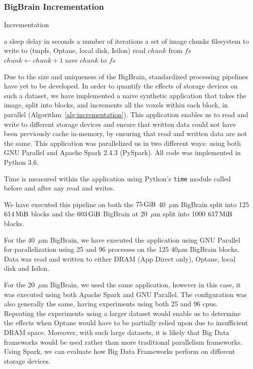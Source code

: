 \documentclass[conference]{IEEEtran}
\newcommand{\Desc}[2]{\State \makebox[2em][l]{#1}#2}
\newcommand{\bigbrain}{BigBrain\xspace}
\begin{document}
\subsubsection{ \bigbrain Incrementation}

\begin{algorithm}\caption{Incrementation}\label{alg:incrementation}
    \begin{algorithmic}[1]
    \Input
        \Desc{$x$}{a sleep delay in seconds}
        \Desc{$n$}{a number of iterations}
        \Desc{$C$}{a set of image chunks}
        \Desc{$fs$}{filesystem to write to (tmpfs, Optane, local disk, Isilon)}
    \EndInput
        \State read $chunk$ from $fs$
        \State $chunk\gets chunk+1$
        \State save $chunk$ to $fs$
    \EndFor
    \end{algorithmic}
\end{algorithm}  

Due to the size and uniqueness of the \bigbrain, standardized processing pipelines
have yet to be developed. In order to quantify the effects of storage devices
on such a dataset, we have implemented a naive synthetic application that takes 
the image, split into blocks, and increments all the voxels within each block, in parallel (Algorithm~\ref{alg:incrementation}).
This application
enables us to read and write to different storage devices and ensure that written
data could not have been previously cache
in-memory, by ensuring that read and written data are not the same. This application
was parallelized us in two different ways: using both GNU Parallel and Apache Spark 2.4.3 (PySpark). 
All code was implemented in Python 3.6.

Time is measured within the application using Python's \texttt{time} module 
called before and after any read and writes.

We have executed this pipeline on both the $\SI{75}{\gibi\byte}$ 40~$\mu$m 
\bigbrain split into 125 $\SI{614}{\mebi\byte}$ blocks and the $\SI{603}{\gibi\byte}$
\bigbrain at 20~$\mu$m split into 1000 $\SI{617}{\mebi\byte}$ blocks.

For the 40~$\mu$m \bigbrain, we have executed the application using GNU Parallel for parallelization
using 25 and 96 processes on the 125 40$\mu$m \bigbrain blocks. Data was read and written to either
DRAM (App Direct only), Optane, local disk and Isilon. 

For the 20~$\mu$m \bigbrain, we used the same application, however in this case, it was executed
using both Apache Spark and GNU Parallel. The configuration was also generally the same, having 
experiments using both 25 and 96 cpus. Repeating the experiments using a larger dataset would enable
us to determine the effects when Optane would have to be partially relied upon due to insufficient DRAM
space. Moreover, with such large datasets, it is likely that Big Data frameworks would be used rather than
more traditional parallelism frameworks. Using Spark, we can evaluate how Big Data Frameworks perform on
different storage devices.
\end{document}
